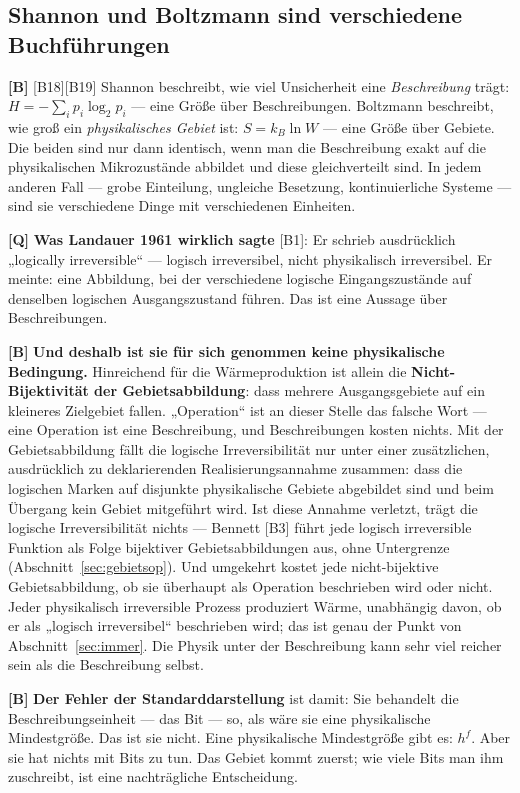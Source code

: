 \subsection{Shannon und Boltzmann sind verschiedene Buchführungen}

\textbf{[B]} [B18][B19] Shannon beschreibt, wie viel Unsicherheit eine \emph{Beschreibung}
trägt: $H = -\sum_i p_i \log_2 p_i$ --- eine Größe über Beschreibungen. Boltzmann
beschreibt, wie groß ein \emph{physikalisches Gebiet} ist: $S = k_B \ln W$ ---
eine Größe über Gebiete. Die beiden sind nur dann identisch, wenn man die
Beschreibung exakt auf die physikalischen Mikrozustände abbildet und diese
gleichverteilt sind. In jedem anderen Fall --- grobe Einteilung, ungleiche
Besetzung, kontinuierliche Systeme --- sind sie verschiedene Dinge mit
verschiedenen Einheiten.

\textbf{[Q]} \textbf{Was Landauer 1961 wirklich sagte} [B1]: Er schrieb ausdrücklich
„logically irreversible“ --- logisch irreversibel, nicht physikalisch
irreversibel. Er meinte: eine Abbildung, bei der verschiedene logische
Eingangszustände auf denselben logischen Ausgangszustand führen. Das ist eine
Aussage über Beschreibungen.

\textbf{[B]} \textbf{Und deshalb ist sie für sich genommen keine physikalische Bedingung.}
Hinreichend für die Wärmeproduktion ist allein die \textbf{Nicht-Bijektivität der
Gebietsabbildung}: dass mehrere Ausgangsgebiete auf ein kleineres Zielgebiet
fallen. „Operation“ ist an dieser Stelle das falsche Wort --- eine Operation ist
eine Beschreibung, und Beschreibungen kosten nichts. Mit der Gebietsabbildung
fällt die logische Irreversibilität nur unter einer zusätzlichen, ausdrücklich zu
deklarierenden Realisierungsannahme zusammen: dass die logischen Marken auf
disjunkte physikalische Gebiete abgebildet sind und beim Übergang kein Gebiet
mitgeführt wird. Ist diese Annahme verletzt, trägt die logische Irreversibilität
nichts --- Bennett [B3] führt jede logisch irreversible Funktion als Folge
bijektiver Gebietsabbildungen aus, ohne Untergrenze
(Abschnitt~\ref{sec:gebietsop}). Und umgekehrt kostet jede nicht-bijektive
Gebietsabbildung, ob sie überhaupt als Operation beschrieben wird oder nicht.
Jeder physikalisch irreversible Prozess produziert Wärme, unabhängig davon, ob er
als „logisch irreversibel“ beschrieben wird; das ist genau der Punkt von
Abschnitt~\ref{sec:immer}. Die Physik unter der Beschreibung kann sehr viel
reicher sein als die Beschreibung selbst.

\textbf{[B]} \textbf{Der Fehler der Standarddarstellung} ist damit: Sie behandelt die
Beschreibungseinheit --- das Bit --- so, als wäre sie eine physikalische
Mindestgröße. Das ist sie nicht. Eine physikalische Mindestgröße gibt es: $h^f$.
Aber sie hat nichts mit Bits zu tun. Das Gebiet kommt zuerst; wie viele Bits man
ihm zuschreibt, ist eine nachträgliche Entscheidung.

